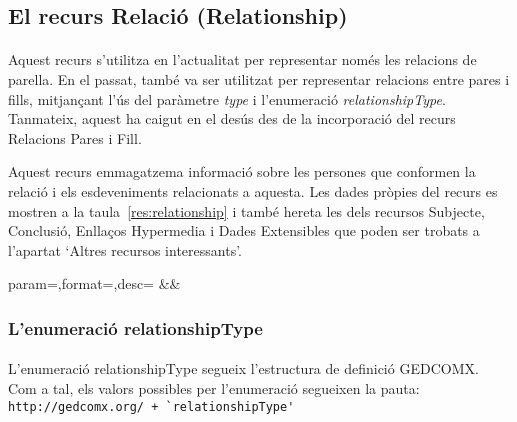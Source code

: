 \subsection{El recurs Relació (Relationship)}

    \paragraph{}
    Aquest recurs s'utilitza en l'actualitat per representar només les relacions de parella. En el passat, també va ser utilitzat per representar relacions entre pares i fills, mitjançant l'ús del paràmetre \emph{type} i l'enumeració \emph{relationshipType}. Tanmateix, aquest ha caigut en el desús des de la incorporació del recurs Relacions Pares i Fill.

    Aquest recurs emmagatzema informació sobre les persones que conformen la relació i els esdeveniments relacionats a aquesta. Les dades pròpies del recurs es mostren a la taula~\ref{res:relationship} i també hereta les dels recursos Subjecte, Conclusió, Enllaços Hypermedia i Dades Extensibles que poden ser trobats a l'apartat `Altres recursos interessants'.

    \begin{center}
             {param=\param,format=\format,desc=\desc}
             {\param&\format&\desc}
     \end{center}


    \subsubsection{L'enumeració relationshipType}

    \paragraph{}
    L'enumeració relationshipType segueix l'estructura de definició GEDCOMX. Com a tal, els valors possibles per l'enumeració segueixen la pauta:\\\verb|http://gedcomx.org/ + `relationshipType'|

